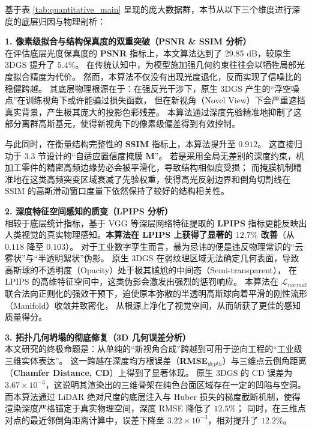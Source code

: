 基于表 \ref{tab:quantitative_main} 呈现的庞大数据群，本节从以下三个维度进行深度的底层归因与物理剖析：

\textbf{1. 像素级拟合与结构保真度的双重突破（PSNR \& SSIM 分析）} \\
在评估底层光度保真度的 \textbf{PSNR} 指标上，本文算法达到了 29.85 dB，较原生 3DGS 提升了 $5.4\%$。
在传统认知中，为模型施加强几何约束往往会以牺牲局部光度拟合精度为代价。
然而，本算法不仅没有出现光度退化，反而实现了信噪比的稳健跨越。
其底层物理根源在于：在强反光干涉下，原生 3DGS 产生的“浮空噪点”在训练视角下或许能骗过损失函数，
但在新视角（Novel View）下会严重遮挡真实背景，产生极其庞大的投影色彩残差。
本算法通过深度先验精准地抑制了这部分离群高斯基元，使得新视角下的像素级偏差得到有效控制。

与此同时，在衡量结构完整性的 \textbf{SSIM} 指标上，本算法提升至 $0.912$。
这直接归功于 3.3 节设计的“自适应置信度掩膜 $\bm{M}$”。
若是采用全局无差别的深度约束，机加工零件的精密高频边缘势必会被平滑化，导致结构相似度受损；
而掩膜机制精准地在这类高频突变区域衰减了先验权重，使得高光反射边界和倒角切割线在 SSIM 的高斯滑动窗口度量下依然保持了较好的结构相关性。

\textbf{2. 深度特征空间感知的质变（LPIPS 分析）} \\
相较于底层统计指标，基于 VGG 等深层网络特征提取的 \textbf{LPIPS} 指标更能反映出人类视觉的真实物理感知。\textbf{本算法在 LPIPS 上获得了显著的 $12.7\%$ 改善}（从 $0.118$ 降至 $0.103$）。
对于工业数字孪生而言，最为忌讳的便是违反物理常识的“云雾状”与“半透明絮状”伪影。
原生 3DGS 在弱纹理区域无法确定几何表面，导致高斯球的不透明度（Opacity）处于极其尴尬的中间态（Semi-transparent），
在 LPIPS 的高维特征空间中，这类伪影会激发出强烈的惩罚响应。
本算法在 $\mathcal{L}_{normal}$ 联合法向正则化的强效干预下，迫使原本弥散的半透明高斯球向着平滑的刚性流形（Manifold）收敛并致密化，
从根源上净化了视觉空间，从而斩获了更佳的感知质量得分。

\textbf{3. 拓扑几何坍塌的彻底修复（3D 几何误差分析）} \\
本文研究的终极命题是：从单纯的“新视角合成”跨越到可用于逆向工程的“工业级三维实体表达”。
这一跨越在深度均方根误差（\textbf{RMSE$_{depth}$}）与三维点云倒角距离（\textbf{Chamfer Distance, CD}）上得到了显著体现。
原生 3DGS 的 CD 误差为 $3.67 \times 10^{-3}$，这说明其渲染出的三维骨架在纯色台面区域存在一定的凹陷与空洞。
而本算法通过 LiDAR 绝对尺度的底层注入与 Huber 损失的梯度截断机制，使得渲染深度严格锚定于真实物理空间，深度 RMSE 降低了 $12.5\%$；
同时，在三维点对点的最近邻倒角距离计算中，误差下降至 $3.22 \times 10^{-3}$，相对提升了 $12.2\%$。

